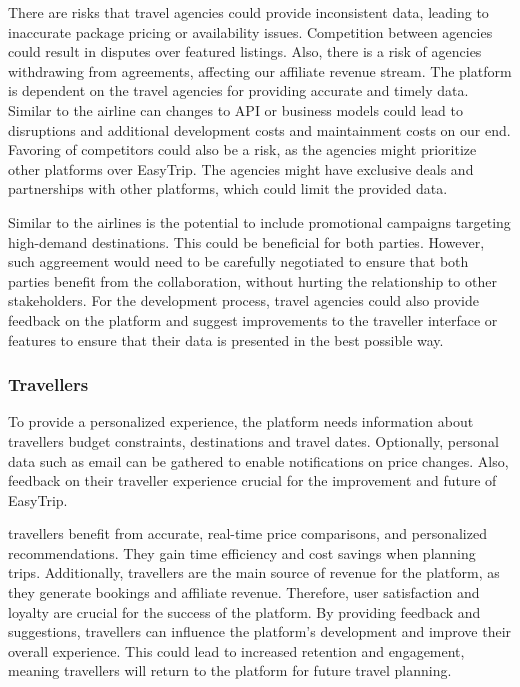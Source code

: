 There are risks that travel agencies could provide inconsistent data, leading to inaccurate package pricing or availability issues. Competition between agencies could result in disputes over featured listings. Also, there is a risk of agencies withdrawing from agreements, affecting our affiliate revenue stream. The platform is dependent on the travel agencies for providing accurate and timely data. Similar to the airline can changes to API or business models could lead to disruptions and additional development costs and maintainment costs on our end. Favoring of competitors could also be a risk, as the agencies might prioritize other platforms over EasyTrip. The agencies might have exclusive deals and partnerships with other platforms, which could limit the provided data.

Similar to the airlines is the potential to include promotional campaigns targeting high-demand destinations. This could be beneficial for both parties. However, such aggreement would need to be carefully negotiated to ensure that both parties benefit from the collaboration, without hurting the relationship to other stakeholders. For the development process, travel agencies could also provide feedback on the platform and suggest improvements to the traveller interface or features to ensure that their data is presented in the best possible way.

\subsubsection{Travellers}
To provide a personalized experience, the platform needs information about travellers budget constraints, destinations and travel dates. Optionally, personal data such as email can be gathered to enable notifications on price changes. Also, feedback on their traveller experience crucial for the improvement and future of EasyTrip.

travellers benefit from accurate, real-time price comparisons, and personalized recommendations. They gain time efficiency and cost savings when planning trips. Additionally, travellers are the main source of revenue for the platform, as they generate bookings and affiliate revenue. Therefore, user satisfaction and loyalty are crucial for the success of the platform. By providing feedback and suggestions, travellers can influence the platform's development and improve their overall experience. This could lead to increased retention and engagement, meaning travellers will return to the platform for future travel planning.

